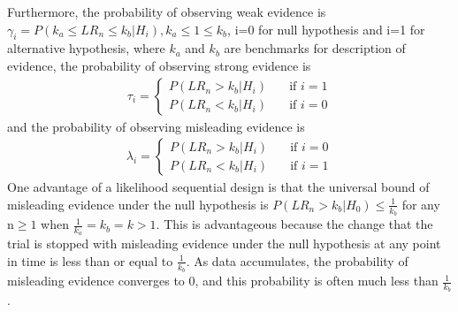 \documentclass[12pt]{report}\usepackage[]{graphicx}\usepackage[]{color}
\newlength{\li}\setlength{\li}{14.48pt}
\newlength{\di}\setlength{\di}{-3.5mm}
\begin{document}
Furthermore, the probability of observing weak evidence is $\gamma_i = P(k_a \leq LR_n \leq k_b | H_i), k_a \leq 1 \leq k_b$, i=0 for null hypothesis and i=1 for alternative hypothesis, where $k_a$ and $k_b$ are benchmarks for description of evidence, the probability of observing strong evidence is 
\begin{equation}
\begin{aligned}
\tau_i = \left\{
        \begin{array}{ll}
            P(LR_n > k_b|H_i) & \quad \text{if } i = 1 \\
            P(LR_n < k_b|H_i) & \quad \text{if } i = 0
        \end{array}
    \right.
\end{aligned}
\end{equation}
and the probability of observing misleading evidence is 
\begin{equation}
\begin{aligned}
\lambda_i = \left\{
        \begin{array}{ll}
            P(LR_n > k_b|H_i) & \quad \text{if } i = 0 \\
            P(LR_n < k_b|H_i) & \quad \text{if } i = 1
        \end{array}
    \right.
\end{aligned}
\end{equation}
One advantage of a likelihood sequential design is that the universal bound of misleading evidence under the null hypothesis is $P(LR_n > k_b|H_0) \leq \frac{1}{k_b}$ for any $\mbox{n} \geq 1$ when $\frac{1}{k_a} = k_b = k > 1$. This is advantageous because the change that the trial is stopped with misleading evidence under the null hypothesis at any point in time is less than or equal to $\frac{1}{k_b}$. As data accumulates, the probability of misleading evidence converges to 0, and this probability is often much less than $\frac{1}{k_b}$ \cite{BlumeNotes} \cite{Blume08}. \\
\end{document}
